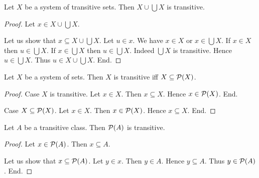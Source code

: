 \documentclass[../../set-theory/set-theory.tex]{subfiles}
\begin{document}
  \begin{forthel}
    \begin{proposition}
      Let $X$ be a system of transitive sets.
      Then $X \cup \bigcup X$ is transitive.
    \end{proposition}
    \begin{proof}
      Let $x \in X \cup \bigcup X$.

      Let us show that $x \subseteq X \cup \bigcup X$.
        Let $u \in x$.
        We have $x \in X$ or $x \in \bigcup X$.
        If $x \in X$then $u \in \bigcup X$.
        If $x \in \bigcup X$ then $u \in \bigcup X$.
        Indeed $\bigcup X$ is transitive.
        Hence $u \in \bigcup X$.
        Thus $u \in X \cup \bigcup X$.
      End.
    \end{proof}
  \end{forthel}

  \begin{forthel}
    \begin{proposition}
      Let $X$ be a system of sets.
      Then $X$ is transitive iff $X \subseteq \mathcal{P}(X)$.
    \end{proposition}
    \begin{proof}
      Case $X$ is transitive.
        Let $x \in X$.
        Then $x \subseteq X$.
        Hence $x \in \mathcal{P}(X)$.
      End.

      Case $X \subseteq \mathcal{P}(X)$.
        Let $x \in X$.
        Then $x \in \mathcal{P}(X)$.
        Hence $x \subseteq X$.
      End.
    \end{proof}
  \end{forthel}

  \begin{forthel}
    \begin{proposition}
      Let $A$ be a transitive class.
      Then $\mathcal{P}(A)$ is transitive.
    \end{proposition}
    \begin{proof}
      Let $x \in \mathcal{P}(A)$.
      Then $x \subseteq A$.

      Let us show that $x \subseteq \mathcal{P}(A)$.
        Let $y \in x$.
        Then $y \in A$.
        Hence $y \subseteq A$.
        Thus $y \in \mathcal{P}(A)$.
      End.
    \end{proof}
  \end{forthel}
\end{document}
